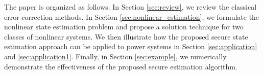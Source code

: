 The paper is organized as follows: In Section \ref{sec:review}, we review the classical error correction methods. In Section \ref{sec:nonlinear_estimation}, we formulate the nonlinear state estimation problem and propose a solution technique for two classes of nonlinear systems. We then illustrate how the proposed secure state estimation approach can be applied to power systems in Section \ref{sec:application} and \ref{sec:application1}. Finally, in Section \ref{sec:example}, we numerically demonstrate the effectiveness of the proposed secure estimation algorithm.